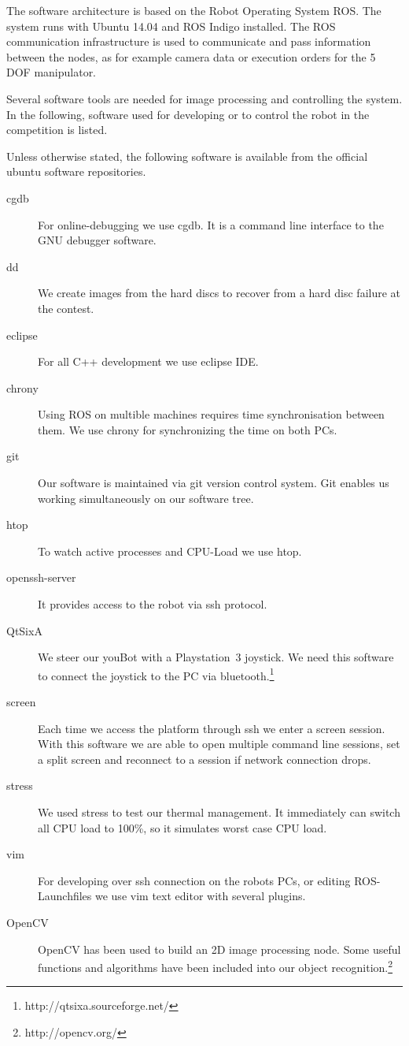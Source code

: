 The software architecture is based on the Robot Operating System ROS. The system runs with Ubuntu 14.04 and ROS Indigo installed. The ROS communication infrastructure is used to communicate and pass information between the nodes, as for example camera data or execution orders for the 5 DOF manipulator. 

Several software tools are needed for image processing and controlling the system. In the following, software used for developing or to control the robot in the competition is listed. 

Unless otherwise stated, the following software is available from the official ubuntu software repositories.

\begin{description}
	\item [cgdb] For online-debugging we use cgdb. It is a command line interface to the GNU debugger software. 
	\item [dd] We create images from the hard discs to recover from a hard disc failure at the contest.
	\item [eclipse] For all C++ development we use eclipse IDE. 
	\item [chrony] Using ROS on multible machines requires time synchronisation between them. We use chrony for synchronizing the time on both PCs.
	\item [git] Our software is maintained via git version  control system. Git enables us working simultaneously on our software tree.  
	\item [htop] To watch active processes and CPU-Load we use htop. 
	\item [openssh-server] It provides access to the robot via ssh protocol. 
	\item [QtSixA] We steer our youBot with a Playstation~3 joystick. We need this software to connect the joystick to the PC via bluetooth.\footnote{http://qtsixa.sourceforge.net/}
	\item  [screen] Each time we access the platform through ssh we enter a screen session. With this software we are able to open multiple command line sessions, set a split screen and reconnect to a session if network connection drops. 
	\item [stress] We used stress to test our thermal management. It immediately can switch all CPU load to 100\%, so it simulates worst case CPU load. 
	\item [vim] For developing over ssh connection on the robots PCs, or editing ROS-Launchfiles we use vim text editor with several plugins.
	\item [OpenCV] OpenCV has been used to build an 2D image processing node. Some useful functions and algorithms have been included into our object recognition.\footnote{http://opencv.org/}
\end{description}

